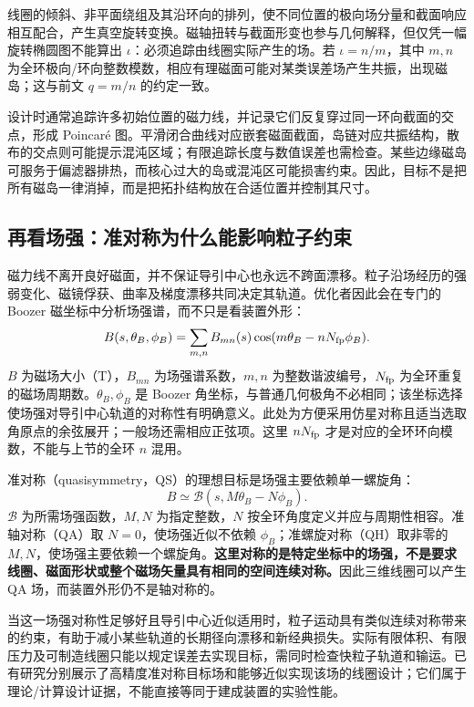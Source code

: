 \documentclass[12pt,fontset=none]{ctexart}
\numberwithin{equation}{section}
\numberwithin{table}{section}
\numberwithin{figure}{section}
\begin{document}
线圈的倾斜、非平面绕组及其沿环向的排列，使不同位置的极向场分量和截面响应相互配合，产生真空旋转变换。磁轴扭转与截面形变也参与几何解释，但仅凭一幅旋转椭圆图不能算出 $\iota$：必须追踪由线圈实际产生的场。若 $\iota=n/m$，其中 $m,n$ 为全环极向/环向整数模数，相应有理磁面可能对某类误差场产生共振，出现磁岛；这与前文 $q=m/n$ 的约定一致。

设计时通常追踪许多初始位置的磁力线，并记录它们反复穿过同一环向截面的交点，形成 Poincar\'e 图。平滑闭合曲线对应嵌套磁面截面，岛链对应共振结构，散布的交点则可能提示混沌区域；有限追踪长度与数值误差也需检查。某些边缘磁岛可服务于偏滤器排热，而核心过大的岛或混沌区可能损害约束。因此，目标不是把所有磁岛一律消掉，而是把拓扑结构放在合适位置并控制其尺寸。

\subsection{再看场强：准对称为什么能影响粒子约束}\label{sec:stellarator-qs}

磁力线不离开良好磁面，并不保证导引中心也永远不跨面漂移。粒子沿场经历的强弱变化、磁镜俘获、曲率及梯度漂移共同决定其轨道。优化者因此会在专门的 Boozer 磁坐标中分析场强谱，而不只是看装置外形：
\begin{equation}\label{eq:stellarator-b-spectrum}
 B(s,\theta_B,\phi_B)=\sum_{m,n}B_{mn}(s)
 \cos(m\theta_B-nN_{\rm fp}\phi_B).
\end{equation}
$B$ 为磁场大小（T），$B_{mn}$ 为场强谱系数，$m,n$ 为整数谐波编号，$N_{\rm fp}$ 为全环重复的磁场周期数。$\theta_B,\phi_B$ 是 Boozer 角坐标，与普通几何极角不必相同；该坐标选择使场强对导引中心轨道的对称性有明确意义。此处为方便采用仿星对称且适当选取角原点的余弦展开；一般场还需相应正弦项。这里 $nN_{\rm fp}$ 才是对应的全环环向模数，不能与上节的全环 $n$ 混用。

准对称（quasisymmetry，QS）的理想目标是场强主要依赖单一螺旋角：
\begin{equation}\label{eq:stellarator-qs}
 B\simeq\mathcal B(s,M\theta_B-N\phi_B).
\end{equation}
$\mathcal B$ 为所需场强函数，$M,N$ 为指定整数，$N$ 按全环角度定义并应与周期性相容。准轴对称（QA）取 $N=0$，使场强近似不依赖 $\phi_B$；准螺旋对称（QH）取非零的 $M,N$，使场强主要依赖一个螺旋角。\textbf{这里对称的是特定坐标中的场强，不是要求线圈、磁面形状或整个磁场矢量具有相同的空间连续对称。}因此三维线圈可以产生 QA 场，而装置外形仍不是轴对称的。

当这一场强对称性足够好且导引中心近似适用时，粒子运动具有类似连续对称带来的约束，有助于减小某些轨道的长期径向漂移和新经典损失。实际有限体积、有限压力及可制造线圈只能以规定误差去实现目标，需同时检查快粒子轨道和输运。已有研究分别展示了高精度准对称目标场和能够近似实现该场的线圈设计；它们属于理论/计算设计证据，不能直接等同于建成装置的实验性能\cite{Sprecise,Scoils}。
\end{document}
